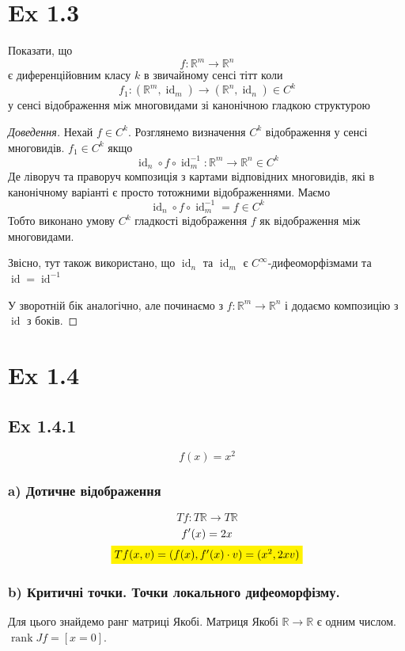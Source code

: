\documentclass[10pt, a4paper]{article} %
\newcommand{\R}{\mathbb{R}}
\DeclareMathOperator{\id}{id}
\DeclareMathOperator{\rank}{rank}
\begin{document}
\section*{Ex 1.3}
\begin{mdframed}
    Показати, що 
    \[f : \R^m \to \R^n\]
    є диференційовним класу $k$ в звичайному сенсі тітт коли 
    \[f_1: (\R^m, \id_m) \to (\R^n, \id_n) \in C^k\]
    у сенсі відображення між многовидами зі канонічною гладкою структурою
\end{mdframed}

\begin{proof}[Доведення]
    Нехай $f \in C^k$.
    Розглянемо визначення $C^k$ відображення у сенсі многовидів. $f_1 \in C^k$ якщо
    \[\id_n \circ f \circ \id_m^{-1} : \R^m \to \R^n \in C^k \]
    Де ліворуч та праворуч композиція з картами відповідних многовидів, які в канонічному варіанті є просто тотожними відображеннями.
    Маємо
    \[\id_n \circ f \circ \id_m^{-1} = f \in C^k\]
    Тобто виконано умову $C^k$ гладкості відображення $f$ як відображення між многовидами.

    Звісно, тут також використано, що $\id_n$ та $\id_m$ є $C^\infty$-дифеоморфізмами та $\id = \id^{-1}$

    У зворотній бік аналогічно, але починаємо з $f : \R^m \to \R^n$ і додаємо композицію з $\id$ з боків.
\end{proof}

\newpage
\section*{Ex 1.4}
\subsection*{Ex 1.4.1}
\begin{mdframed}
    \[f(x) = x^2\]
\end{mdframed}

\subsubsection*{a) Дотичне відображення}
\[Tf : T\R \to T\R\]
\begin{gather*}
    f'(x) = 2x\\
    \colorbox{yellow}{$Tf(x,v) = (f(x), f'(x)\cdot v) = (x^2, 2xv)$}
\end{gather*}

\subsubsection*{b) Критичні точки. Точки локального дифеоморфізму.}
Для цього знайдемо ранг матриці Якобі.
Матриця Якобі $\R\to\R$ є одним числом. $\rank Jf = [x=0]$.
\end{document}

